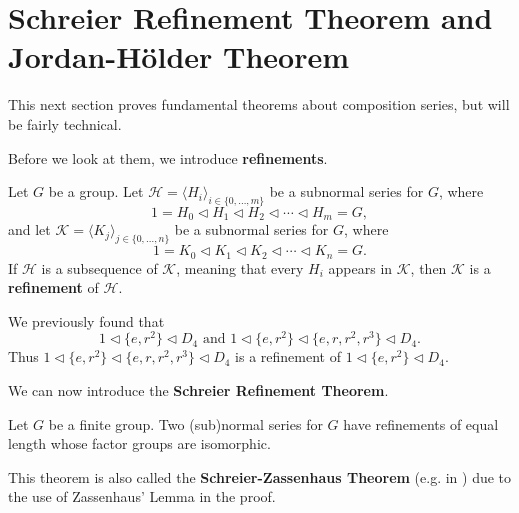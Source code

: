 \section{Schreier Refinement Theorem and Jordan-H\"older Theorem}
This next section proves fundamental theorems about composition series, but will be fairly technical.

Before we look at them, we introduce \textbf{refinements}.
\begin{definition}
    Let $G$ be a group. Let $\mathcal{H} = \langle H_i \rangle_{i\in\{0,\dots,m\}}$ be a subnormal series for $G$, where
    \[
        1 = H_0 \lhd H_1 \lhd H_2 \lhd \cdots \lhd H_m = G,
    \]
    and let $\mathcal{K} = \langle K_j \rangle_{j\in\{0,\dots,n\}}$ be a subnormal series for $G$, where
    \[
        1 = K_0 \lhd K_1 \lhd K_2 \lhd \cdots \lhd K_n = G.
    \]
    If $\mathcal{H}$ is a subsequence of $\mathcal{K}$, meaning that every $H_i$ appears in $\mathcal{K}$, then $\mathcal{K}$ is a \textbf{refinement} of $\mathcal{H}$.
\end{definition}
\begin{example}
    We previously found that
    \[
        1 \lhd \{e, r^2\} \lhd D_4 \text{ and } 1 \lhd \{e, r^2\} \lhd \{e, r, r^2, r^3\} \lhd D_4.    
    \]
    Thus $1 \lhd \{e, r^2\} \lhd \{e, r, r^2, r^3\} \lhd D_4$ is a refinement of $1 \lhd \{e, r^2\} \lhd D_4$.
\end{example}

We can now introduce the \textbf{Schreier Refinement Theorem}.
\begin{theorem}\label{thrm-schreier}
    Let $G$ be a finite group. Two (sub)normal series for $G$ have refinements of equal length whose factor groups are isomorphic.
\end{theorem}
\begin{remark}
    This theorem is also called the \textbf{Schreier-Zassenhaus Theorem} (e.g. in \cite{clark_1984}) due to the use of Zassenhaus' Lemma in the proof.
\end{remark}

